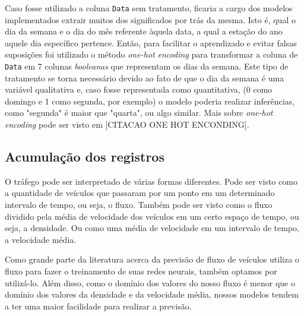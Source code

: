
Caso fosse utilizado a coluna \texttt{Data} sem tratamento, ficaria a cargo dos modelos implementados extrair muitos dos significados por trás da mesma. Isto é, qual o dia da semana e o dia do mês referente àquela data, a qual a estação do ano aquele dia específico pertence. Então, para facilitar o aprendizado e evitar falsas suposições foi utilizado o método \textit{one-hot encoding} para transformar a coluna de \texttt{Data} em 7 colunas \textit{booleanas} que representam os dias da semana. Este tipo de tratamento se torna necessário devido ao fato de que o dia da semana é uma variável qualitativa e, caso fosse representada como quantitativa, (0 como domingo e 1 como segunda, por exemplo) o modelo poderia realizar inferências, como "segunda" é maior que "quarta", ou algo similar. Mais sobre \textit{one-hot encoding} pode ser visto em [CITACAO ONE HOT ENCONDING].

\subsection{Acumulação dos registros}

O tráfego pode ser interpretado de várias formas diferentes. Pode ser visto como a quantidade de veículos que passaram por um ponto em um determinado intervalo de tempo, ou seja, o fluxo. Também pode ser visto como o fluxo dividido pela média de velocidade dos veículos em um certo espaço de tempo, ou seja, a densidade. Ou como uma média de velocidade em um intervalo de tempo, a velocidade média.

Como grande parte da literatura acerca da previsão de fluxo de veículos utiliza o fluxo para fazer o treinamento de suas redes neurais, também optamos por utilizá-lo. Além disso, como o domínio dos valores do nosso fluxo é menor que o domínio dos valores da densidade e da velocidade média, nossos modelos tendem a ter uma maior facilidade para realizar a previsão.

